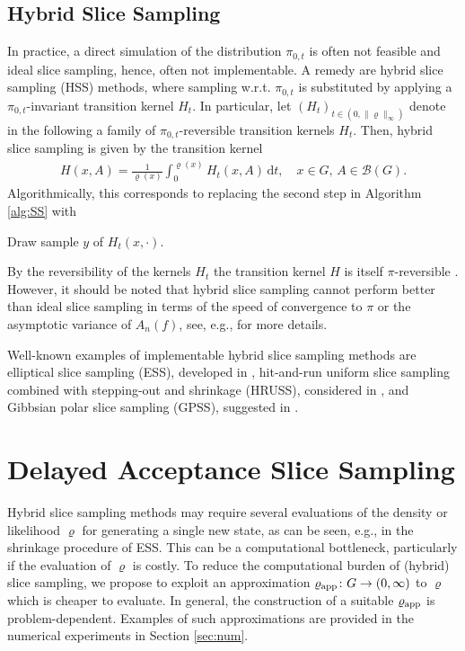 \documentclass[sn-mathphys-num]{sn-jnl}%
\theoremstyle{thmstyleone}%
\theoremstyle{thmstyletwo}%
\theoremstyle{thmstylethree}%
\newcommand{\rhoapp}{\varrho_{{\rm app}}}
\newcommand{\change}[1]{\bgroup\color{black}#1\egroup}    %
\begin{document}
\subsection{Hybrid Slice Sampling}\label{subsec:hss}
In practice, a direct simulation of the distribution $\pi_{0,t}$ is often not feasible and ideal slice sampling, hence, often not implementable.
A remedy are hybrid slice sampling (HSS) methods, where sampling w.r.t. $\pi_{0,t}$ is substituted by applying a $\pi_{0,t}$-invariant transition kernel $H_t$.
In particular, let $(H_t)_{t \in (0, \|\varrho\|_\infty)}$ denote in the following a family of $\pi_{0,t}$-reversible transition kernels $H_t$. 
Then, hybrid slice sampling is given by the transition kernel 
\begin{align*}
	H(x,A)=\frac{1}{\varrho(x)}\int_{0}^{\varrho(x)} H_t(x,A) \, \mathrm{d}t, \quad x\in G,\, A\in\mathcal{B}(G).   	
\end{align*}
Algorithmically, this corresponds to replacing the second step in Algorithm \ref{alg:SS} with

\vspace*{0.2cm}

\begin{algorithmic}[1]
\setcounter{ALG@line}{1}
       \State Draw sample $y$ of $H_t(x,\cdot)$.
\end{algorithmic}

\vspace*{0.2cm}

By the reversibility of the kernels $H_t$ the transition kernel $H$ is itself $\pi$-reversible \cite[Lemma~1]{LatuszynskiRudolf2024}.
However, it should be noted that hybrid slice sampling cannot perform better than ideal slice sampling in terms of the speed of convergence to $\pi$ or the asymptotic variance of $A_n(f)$, see, e.g., \cite{LatuszynskiRudolf2024, RudolfUllrich2018} for more details.

Well-known examples of implementable hybrid slice sampling methods are %
elliptical slice sampling (ESS), developed in \cite{MurrayEtAl2010}, hit-and-run uniform slice sampling combined with stepping-out and shrinkage (HRUSS), considered in \cite{LatuszynskiRudolf2024}, and Gibbsian polar slice sampling (GPSS), suggested in \cite{SchaerEtAl2023}. 


\section{Delayed Acceptance Slice Sampling}\label{sec:DASS}
Hybrid slice sampling methods may require several evaluations of the density or likelihood $\varrho$ for generating a single new state, as can be seen, e.g., in the shrinkage procedure of ESS. This can be a computational bottleneck, particularly if the evaluation of $\varrho$ is costly. To reduce the computational burden of \change{(hybrid)} slice sampling, we propose to exploit an approximation $\rhoapp\colon G \to (0,\infty)$ to $\varrho$ which is cheaper to evaluate. In general, the construction of a suitable $\rhoapp$ is problem-dependent. Examples of such approximations are provided in the numerical experiments in Section \ref{sec:num}.
\end{document}
